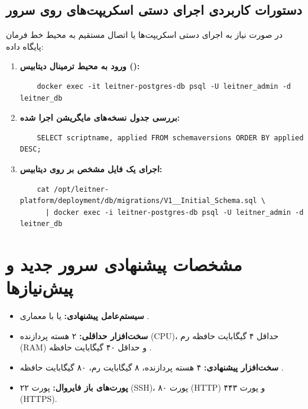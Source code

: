 \documentclass[11pt,a4paper]{article}
\begin{document}
\subsection{دستورات کاربردی اجرای دستی اسکریپت‌های  روی سرور}
در صورت نیاز به اجرای دستی اسکریپت‌ها یا اتصال مستقیم به محیط خط فرمان پایگاه داده:

\begin{enumerate}
    \item \textbf{ورود به محیط ترمینال دیتابیس ():}
    \begin{latin}
    \small
    \begin{verbatim}
    docker exec -it leitner-postgres-db psql -U leitner_admin -d leitner_db
    \end{verbatim}
    \end{latin}
    \item \textbf{بررسی جدول نسخه‌های مایگریشن اجرا شده:}
    \begin{latin}
    \small
    \begin{verbatim}
    SELECT scriptname, applied FROM schemaversions ORDER BY applied DESC;
    \end{verbatim}
    \end{latin}
    \item \textbf{اجرای یک فایل  مشخص بر روی دیتابیس:}
    \begin{latin}
    \small
    \begin{verbatim}
    cat /opt/leitner-platform/deployment/db/migrations/V1__Initial_Schema.sql \
      | docker exec -i leitner-postgres-db psql -U leitner_admin -d leitner_db
    \end{verbatim}
    \end{latin}
\end{enumerate}

\newpage
\section{مشخصات پیشنهادی سرور جدید و پیش‌نیازها}
\begin{itemize}
    \item \textbf{سیستم‌عامل پیشنهادی:}  یا  با معماری .
    \item \textbf{سخت‌افزار حداقلی:} ۲ هسته پردازنده (CPU)، حداقل ۴ گیگابایت حافظه رم (RAM) و حداقل ۴۰ گیگابایت حافظه .
    \item \textbf{سخت‌افزار پیشنهادی:} ۴ هسته پردازنده، ۸ گیگابایت رم، ۸۰ گیگابایت حافظه \lr{NVMe SSD}.
    \item \textbf{پورت‌های باز فایروال:} پورت ۲۲ (SSH)، پورت ۸۰ (HTTP) و پورت ۴۴۳ (HTTPS).
\end{itemize}
\end{document}
